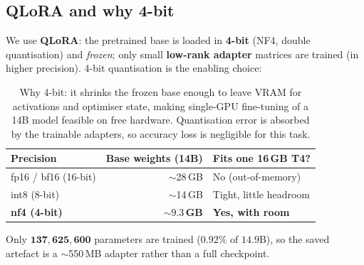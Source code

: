 \documentclass[11pt]{article}
\begin{document}
\subsection{QLoRA and why 4-bit}
We use \textbf{QLoRA}: the pretrained base is loaded in \textbf{4-bit} (NF4,
double quantisation) and \emph{frozen}; only small \textbf{low-rank adapter}
matrices are trained (in higher precision). 4-bit quantisation is the enabling
choice:
\begin{table}[h]
\centering
\begin{tabular}{lrl}
\toprule
Precision & Base weights (14B) & Fits one 16\,GB T4? \\
\midrule
fp16 / bf16 (16-bit) & $\sim$28\,GB & No (out-of-memory) \\
int8 (8-bit)         & $\sim$14\,GB & Tight, little headroom \\
\textbf{nf4 (4-bit)} & $\mathbf{\sim 9.3}$\,\textbf{GB} & \textbf{Yes, with room} \\
\bottomrule
\end{tabular}
\caption{Why 4-bit: it shrinks the frozen base enough to leave VRAM for
activations and optimiser state, making single-GPU fine-tuning of a 14B model
feasible on free hardware. Quantisation error is absorbed by the trainable
adapters, so accuracy loss is negligible for this task.}
\end{table}

\noindent Only $\mathbf{137{,}625{,}600}$ parameters are trained
($\mathbf{0.92\%}$ of $14.9$B), so the saved artefact is a $\sim$550\,MB
adapter rather than a full checkpoint.
\end{document}
